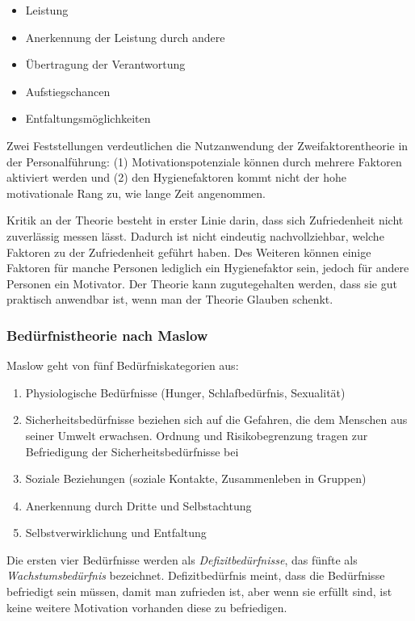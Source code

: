 \begin{itemize}
	\item Leistung
	\item Anerkennung der Leistung durch andere
	\item Übertragung der Verantwortung
	\item Aufstiegschancen
	\item Entfaltungsmöglichkeiten
\end{itemize}

Zwei Feststellungen verdeutlichen die Nutzanwendung der Zweifaktorentheorie in der Personalführung: (1) Motivationspotenziale können durch mehrere Faktoren aktiviert werden und (2) den Hygienefaktoren kommt nicht der hohe motivationale Rang zu, wie lange Zeit angenommen.

Kritik an der Theorie besteht in erster Linie darin, dass sich Zufriedenheit nicht zuverlässig messen lässt. Dadurch ist nicht eindeutig nachvollziehbar, welche Faktoren zu der Zufriedenheit geführt haben. Des Weiteren können einige Faktoren für manche Personen lediglich ein Hygienefaktor sein, jedoch für andere Personen ein Motivator. Der Theorie kann zugutegehalten werden, dass sie gut praktisch anwendbar ist, wenn man der Theorie Glauben schenkt.

\subsubsection{Bedürfnistheorie nach Maslow}

Maslow geht von fünf Bedürfniskategorien aus:
\begin{enumerate}
	\item Physiologische Bedürfnisse (Hunger, Schlafbedürfnis, Sexualität)
	\item Sicherheitsbedürfnisse beziehen sich auf die Gefahren, die dem Menschen aus seiner Umwelt erwachsen. Ordnung und Risikobegrenzung tragen zur Befriedigung der Sicherheitsbedürfnisse bei
	\item Soziale Beziehungen (soziale Kontakte, Zusammenleben in Gruppen)
	\item Anerkennung durch Dritte und Selbstachtung
	\item Selbstverwirklichung und Entfaltung
\end{enumerate}

Die ersten vier Bedürfnisse werden als {\it Defizitbedürfnisse}, das fünfte als {\it Wachstumsbedürfnis} bezeichnet. Defizitbedürfnis meint, dass die Bedürfnisse befriedigt sein müssen, damit man zufrieden ist, aber wenn sie erfüllt sind, ist keine weitere Motivation vorhanden diese zu befriedigen.

